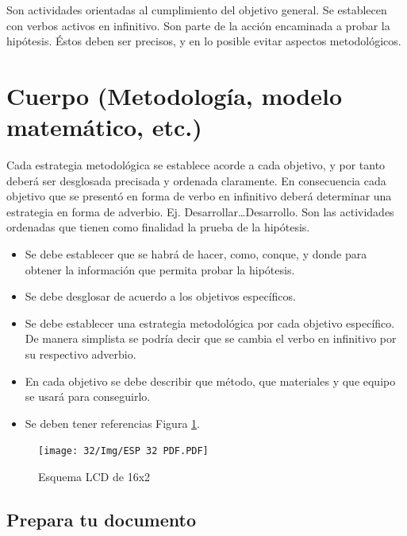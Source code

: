     Son actividades orientadas al cumplimiento del objetivo general. Se establecen con verbos activos en infinitivo. Son parte de la acción encaminada a probar la hipótesis. Éstos deben ser precisos, y en lo posible evitar aspectos metodológicos.
    \section{Cuerpo (Metodología, modelo matemático, etc.)}
    
    Cada estrategia metodológica se establece acorde a cada objetivo, y por tanto deberá ser desglosada precisada y ordenada claramente. En consecuencia cada objetivo que se presentó en forma de verbo en infinitivo deberá determinar una estrategia en forma de adverbio. Ej. Desarrollar…Desarrollo. Son las actividades ordenadas que tienen como finalidad la prueba de la hipótesis. 
    
    \begin{itemize}
        \item Se debe establecer que se habrá de hacer, como, conque, y donde para obtener la información que permita probar la hipótesis.  
        \item Se debe desglosar de acuerdo a los objetivos específicos. 
        \item Se debe establecer una estrategia metodológica por cada objetivo específico. De manera simplista se podría decir que se cambia el verbo en infinitivo por su respectivo adverbio.
        \item En cada objetivo se debe describir que método, que materiales y que equipo se usará para conseguirlo.
        \item Se deben tener referencias Figura \ref{fig:lcd-16x2}.
    \end{itemize}
    \begin{figure}[H]
        \centering
        \texttt{[image: 32/Img/ESP 32 PDF.PDF]}
        \caption{Esquema LCD de 16x2}
        \label{fig:lcd-16x2}
    \end{figure}
    \subsection{Prepara tu documento}
    
